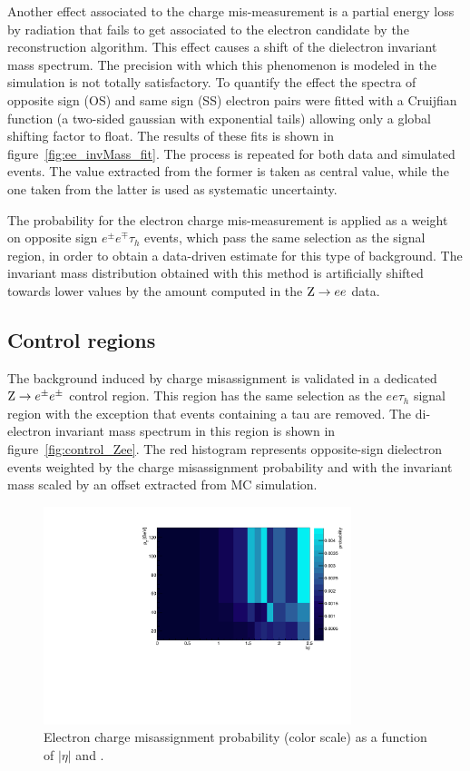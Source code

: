 Another effect associated to the charge mis-measurement is a partial energy loss by radiation that fails to get associated to the electron candidate by the reconstruction algorithm.
This effect causes a shift of the dielectron invariant mass spectrum.
The precision with which this phenomenon is modeled in the simulation is not totally satisfactory. To quantify the effect the spectra of opposite sign (OS) and same sign (SS) electron pairs were fitted with a Cruijfian function (a two-sided gaussian with exponential tails) allowing only a global shifting factor to float. The results of these fits is shown in figure~\ref{fig:ee_invMass_fit}. The process is repeated for both data and simulated events. The value extracted from the former is taken as central value, while the one taken from the latter is used as systematic uncertainty.

The probability for the electron charge mis-measurement is applied as a weight on opposite sign $e^\pm e^\mp \tau_h$ events, which pass the same selection as the signal region, in order to obtain a data-driven estimate for this type of background. The invariant mass distribution obtained with this method is artificially shifted towards lower values 
by the amount computed in the $\mathrm{Z} \rightarrow ee$ data.

\subsection{Control regions}

The background induced by charge misassignment is validated in a dedicated $\mathrm{Z} \rightarrow e^\pm e^\pm$ control region.
This region has the same selection as the $ee\tau_h$ signal region with the exception that events containing a tau are removed.
The di-electron invariant mass spectrum in this region is shown in figure~\ref{fig:control_Zee}. The red histogram represents opposite-sign dielectron events weighted by the charge misassignment probability and with the invariant mass scaled by an offset extracted from MC simulation.

\begin{figure}
  \begin{center}
  \includegraphics[width=0.8\textwidth]{4_Analisys/pics/8TeV/fakerate_fits/charge_flip_prob_map_eid12Medium_h2taucuts.pdf}
  \caption{
  Electron charge misassignment probability (color scale) as a function of $|\eta|$ and \pT.}
  \label{fig:charge_flip_prob_map}
  \end{center}
\end{figure}


